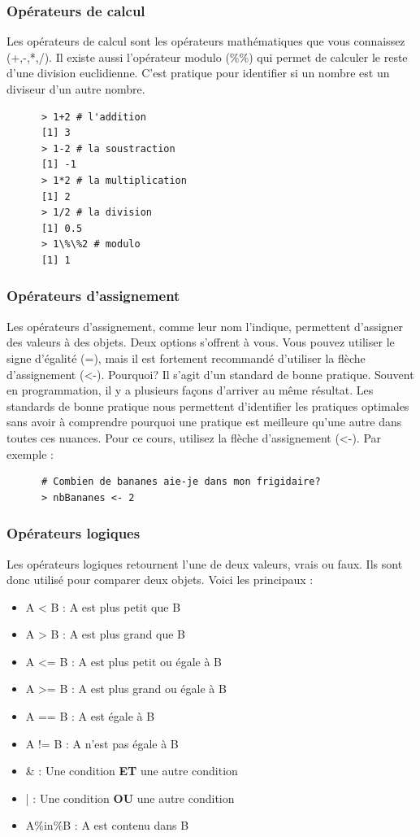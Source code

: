 \documentclass[10.5pt,a4paper]{article}
\begin{document}
    \subsubsection{Opérateurs de calcul}
    Les opérateurs de calcul sont les opérateurs mathématiques que vous connaissez (+,-,*,/). Il existe aussi l'opérateur modulo (\%\%) qui permet de calculer le reste d'une division euclidienne. C'est pratique pour identifier si un nombre est un diviseur d'un autre nombre.  
      \begin{lstlisting}
      > 1+2 # l'addition
      [1] 3
      > 1-2 # la soustraction
      [1] -1
      > 1*2 # la multiplication
      [1] 2
      > 1/2 # la division
      [1] 0.5
      > 1\%\%2 # modulo
      [1] 1
      \end{lstlisting}
      
    \subsubsection{Opérateurs d'assignement}
    Les opérateurs d'assignement, comme leur nom l'indique, permettent d'assigner des valeurs à des objets. Deux options s'offrent à vous. Vous pouvez utiliser le signe d'égalité (=), mais il est fortement recommandé d'utiliser la flèche d'assignement (<-). Pourquoi? Il s'agit d'un standard de bonne pratique. Souvent en programmation, il y a plusieurs façons d'arriver au même résultat. Les standards de bonne pratique nous permettent d'identifier les pratiques optimales sans avoir à comprendre pourquoi une pratique est meilleure qu'une autre dans toutes ces nuances. Pour ce cours, utilisez la flèche d'assignement (<-). Par exemple :
    \begin{lstlisting}
      # Combien de bananes aie-je dans mon frigidaire? 
      > nbBananes <- 2
      \end{lstlisting}
    
    \subsubsection{Opérateurs logiques}
    Les opérateurs logiques retournent l'une de deux valeurs, vrais ou faux. Ils sont donc utilisé pour comparer deux objets. Voici les principaux : 
    \begin{itemize}
      \item A < B    : A est plus petit que B
      \item A > B    : A est plus grand que B
      \item A <= B   : A est plus petit ou égale à B
      \item A >= B   : A est plus grand ou égale à B
      \item A == B   : A est égale à B
      \item A != B   : A n'est pas égale à B
      \item \&       : Une condition \textbf{ET} une autre condition
      \item |        : Une condition \textbf{OU} une autre condition
      \item A\%in\%B : A est contenu dans B
    \end{itemize}
    
\end{document}
